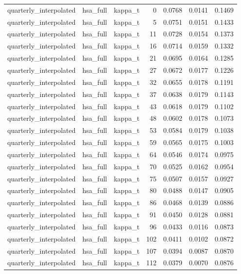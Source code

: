 \begin{tabular}{lllrrrr}
quarterly\_interpolated & hsa\_full & kappa\_t & 0 & 0.0768 & 0.0141 & 0.1469 \\
quarterly\_interpolated & hsa\_full & kappa\_t & 5 & 0.0751 & 0.0151 & 0.1433 \\
quarterly\_interpolated & hsa\_full & kappa\_t & 11 & 0.0728 & 0.0154 & 0.1373 \\
quarterly\_interpolated & hsa\_full & kappa\_t & 16 & 0.0714 & 0.0159 & 0.1332 \\
quarterly\_interpolated & hsa\_full & kappa\_t & 21 & 0.0695 & 0.0164 & 0.1285 \\
quarterly\_interpolated & hsa\_full & kappa\_t & 27 & 0.0672 & 0.0177 & 0.1226 \\
quarterly\_interpolated & hsa\_full & kappa\_t & 32 & 0.0655 & 0.0178 & 0.1191 \\
quarterly\_interpolated & hsa\_full & kappa\_t & 37 & 0.0638 & 0.0179 & 0.1143 \\
quarterly\_interpolated & hsa\_full & kappa\_t & 43 & 0.0618 & 0.0179 & 0.1102 \\
quarterly\_interpolated & hsa\_full & kappa\_t & 48 & 0.0602 & 0.0178 & 0.1073 \\
quarterly\_interpolated & hsa\_full & kappa\_t & 53 & 0.0584 & 0.0179 & 0.1038 \\
quarterly\_interpolated & hsa\_full & kappa\_t & 59 & 0.0565 & 0.0175 & 0.1003 \\
quarterly\_interpolated & hsa\_full & kappa\_t & 64 & 0.0546 & 0.0174 & 0.0975 \\
quarterly\_interpolated & hsa\_full & kappa\_t & 70 & 0.0525 & 0.0162 & 0.0954 \\
quarterly\_interpolated & hsa\_full & kappa\_t & 75 & 0.0507 & 0.0157 & 0.0927 \\
quarterly\_interpolated & hsa\_full & kappa\_t & 80 & 0.0488 & 0.0147 & 0.0905 \\
quarterly\_interpolated & hsa\_full & kappa\_t & 86 & 0.0468 & 0.0139 & 0.0886 \\
quarterly\_interpolated & hsa\_full & kappa\_t & 91 & 0.0450 & 0.0128 & 0.0881 \\
quarterly\_interpolated & hsa\_full & kappa\_t & 96 & 0.0433 & 0.0116 & 0.0873 \\
quarterly\_interpolated & hsa\_full & kappa\_t & 102 & 0.0411 & 0.0102 & 0.0872 \\
quarterly\_interpolated & hsa\_full & kappa\_t & 107 & 0.0394 & 0.0087 & 0.0870 \\
quarterly\_interpolated & hsa\_full & kappa\_t & 112 & 0.0379 & 0.0070 & 0.0876 \\

\end{tabular}
